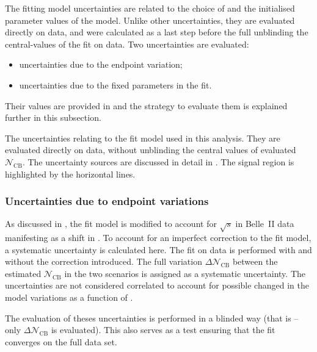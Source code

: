 The \Mbc fitting model uncertainties are related to the choice of  
and the initialised parameter values of the model.
Unlike other uncertainties, they are evaluated directly on data, and were calculated as a last step
before the full unblinding the central-values of the \Mbc fit on data.
Two uncertainties are evaluated:
\begin{itemize}
    \item uncertainties due to the \Mbc endpoint variation;
    \item uncertainties due to the fixed parameters in the \Mbc fit.
\end{itemize}
Their values are provided in  and the strategy to evaluate them is explained further in this subsection.

\begin{table}[htbp!]
    \centering
    \caption{\label{tab:fit_uncertainties} 
    The uncertainties relating to the \Mbc fit model used in this analysis.
    They are evaluated directly on data, without unblinding the central values of evaluated $\mathcal{N}_{\mathrm{CB}}$.
    The uncertainty sources are discussed in detail in .
    The signal region is highlighted by the horizontal lines.
    }
    
\end{table}

\subsubsection{Uncertainties due to \texorpdfstring{\Mbc}{Mbc} endpoint variations}\label{sec:fit_endpoint_systematic}

As discussed in , the fit model is modified to account for $\sqrt{s}$ in Belle~II data manifesting as a shift in \Mbc.
To account for an imperfect correction to the fit model, a systematic uncertainty is calculated here.
The fit on data is performed with and without the \Mbc correction introduced.
The full variation $\Delta\mathcal{N}_{\mathrm{CB}}$ between the estimated $\mathcal{N}_{\mathrm{CB}}$ in the two scenarios is assigned as a systematic uncertainty.
The uncertainties are not considered correlated to account for possible changed in the model variations as a function of \EB.

The evaluation of theses uncertainties is performed in a blinded way (that is -- only $\Delta\mathcal{N}_{\mathrm{CB}}$  is evaluated).
This also serves as a test ensuring that the fit converges on the full data set.

